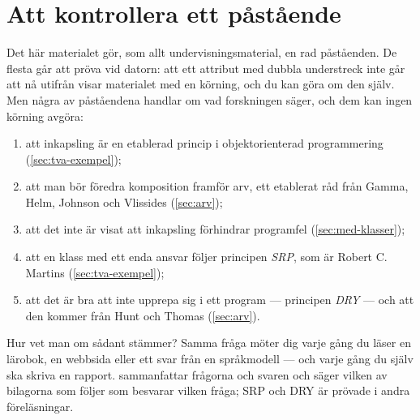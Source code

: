 \chapter{Att kontrollera ett påstående}
\label{app:verifiera-klasser}

Det här materialet gör, som allt undervisningsmaterial, en rad
påståenden.  De flesta går att pröva vid datorn: att ett attribut med
dubbla understreck inte går att nå utifrån visar materialet med en
körning, och du kan göra om den själv.  Men några av påståendena
handlar om vad forskningen säger, och dem kan ingen körning avgöra:
\begin{enumerate}
  \item att inkapsling är en etablerad princip i objektorienterad
    programmering (\cref{sec:tva-exempel});
  \item att man bör föredra komposition framför arv, ett etablerat råd
    från Gamma, Helm, Johnson och Vlissides (\cref{sec:arv});
  \item att det inte är visat att inkapsling förhindrar programfel
    (\cref{sec:med-klasser});
  \item att en klass med ett enda ansvar följer principen \emph{SRP},
    som är Robert C. Martins (\cref{sec:tva-exempel});
  \item att det är bra att inte upprepa sig i ett program --- principen
    \emph{DRY} --- och att den kommer från Hunt och Thomas
    (\cref{sec:arv}).
\end{enumerate}
Hur vet man om sådant stämmer?  Samma fråga möter dig varje gång du läser
en lärobok, en webbsida eller ett svar från en språkmodell --- och varje
gång du själv ska skriva en rapport.  
sammanfattar frågorna och svaren och säger vilken av bilagorna som
följer som besvarar vilken fråga; SRP och DRY är prövade i andra
föreläsningar.

